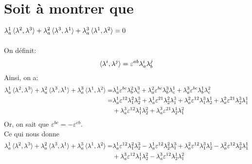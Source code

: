 \documentclass[12pt, a4paper]{article}
\begin{document}
	\section{Soit à montrer que \(\lambda^1_a \braket{\lambda^2, \lambda^3} + \lambda^2_a \braket{\lambda^3, \lambda^1} + \lambda^3_a
	\braket{\lambda^1, \lambda^2}=0
	\)}
	On définit: 
	\begin{equation}
		\braket{\lambda^i, \lambda^j}= \varepsilon^{ab} \lambda^i_a \lambda^j_b
	\end{equation}
	Ainsi, on a:
	\begin{equation}
		\begin{split}
		\lambda^1_a \braket{\lambda^2, \lambda^3} + \lambda^2_a \braket{\lambda^3, \lambda^1} + \lambda^3_a
		\braket{\lambda^1, \lambda^2}
		=
		&\lambda^1_a \varepsilon^{bc} \lambda^2_b \lambda^3_c + 
		\lambda^2_a \varepsilon^{bc} \lambda^3_b \lambda^1_c +
		\lambda^3_a \varepsilon^{bc} \lambda^1_b \lambda^2_c \\
		=
		&\lambda^1_a \varepsilon^{12} \lambda^2_1 \lambda^3_2 +
		\lambda^1_a \varepsilon^{21} \lambda^2_2 \lambda^3_1 +
		\lambda^2_a \varepsilon^{12} \lambda^3_1 \lambda^1_2 +
		\lambda^2_a \varepsilon^{21} \lambda^3_2 \lambda^1_1 \\
		&+\lambda^3_a \varepsilon^{12} \lambda^1_1 \lambda^2_2 +
		\lambda^3_a \varepsilon^{21} \lambda^1_2 \lambda^2_1\\
		\end{split}
	\end{equation}
	Or, on sait que \(\varepsilon^{bc}=-\varepsilon^{cb}\).\\
	Ce qui nous donne 
	\begin{equation}
		\begin{split}
			\lambda^1_a \braket{\lambda^2, \lambda^3} + \lambda^2_a \braket{\lambda^3, \lambda^1} + \lambda^3_a
			\braket{\lambda^1, \lambda^2}
			=
			&\lambda^1_a \varepsilon^{12} \lambda^2_1 \lambda^3_2 -
			\lambda^1_a \varepsilon^{12} \lambda^2_2 \lambda^3_1 +
			\lambda^2_a \varepsilon^{12} \lambda^3_1 \lambda^1_2 -
			\lambda^2_a \varepsilon^{12} \lambda^3_2 \lambda^1_1 \\
			&+\lambda^3_a \varepsilon^{12} \lambda^1_1 \lambda^2_2 -
			\lambda^3_a \varepsilon^{12} \lambda^1_2 \lambda^2_1\\
		\end{split}
	\end{equation}
\end{document}
